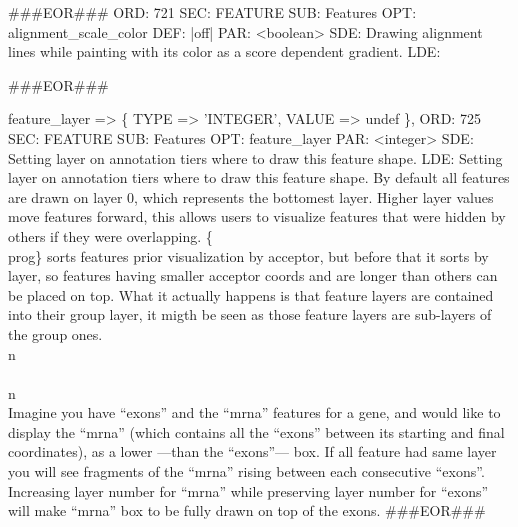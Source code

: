 \documentclass[11pt]{article}
\def\nwendcode{\endtrivlist \endgroup} %
\let\nwdocspar=\par                    %
\begin{document}
###EOR###
ORD: 721
SEC: FEATURE
SUB: Features
OPT: alignment_scale_color
DEF: |off|
PAR: <boolean>
SDE: Drawing alignment lines while painting with its color as a score dependent gradient.
LDE: 

###EOR###
\nwendcode{}\nwdocspar

\nwenddocs{}\plusendmoddef
feature_layer                => \{ TYPE => 'INTEGER', VALUE => undef \},
\eatline
{}\nwendcode{}\plusendmoddef
ORD: 725
SEC: FEATURE
SUB: Features
OPT: feature_layer
PAR: <integer>
SDE: Setting layer on annotation tiers where to draw this feature shape.
LDE: 
Setting layer on annotation tiers where to draw this feature shape. By default
all features are drawn on layer 0, which represents the bottomest layer. Higher
layer values move features forward, this allows users to visualize features 
that were hidden by others if they were overlapping. \{\\prog\} sorts features 
prior visualization by acceptor, but before that it sorts by layer, so 
features having smaller acceptor coords and are longer than others can be 
placed on top. What it actually happens is that feature layers are contained 
into their group layer, it migth be seen as those feature layers are 
sub-layers of the group ones.
\\n\\ \\n\\
Imagine you have ``exons'' and the ``mrna'' features for a gene, and would like
to display the ``mrna'' (which contains all the ``exons'' between its starting 
and final coordinates), as a lower ---than the ``exons''--- box. If all 
feature had same layer you will see fragments of the ``mrna'' rising between 
each consecutive ``exons''. Increasing layer number for ``mrna'' while 
preserving layer number for ``exons'' will make ``mrna'' box to be fully drawn
on top of the exons. 
###EOR###
\nwendcode{}\nwdocspar
\end{document}
